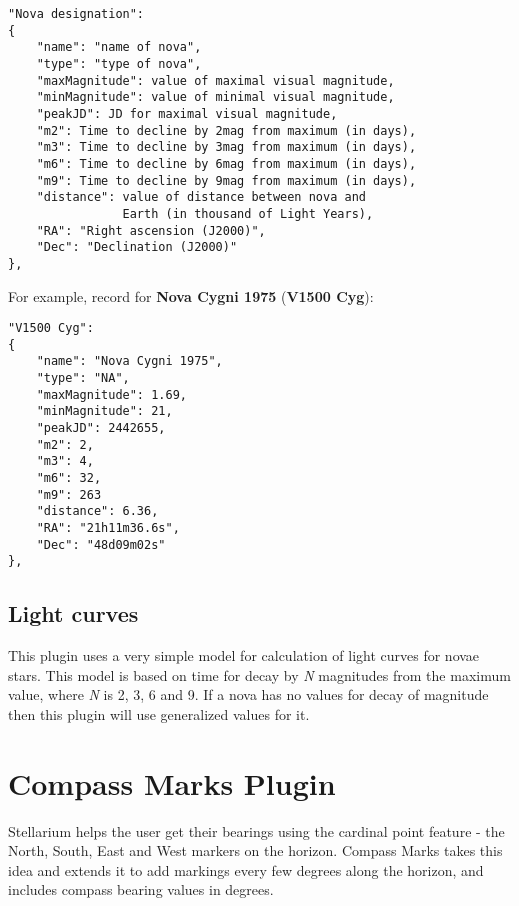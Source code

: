 \begin{config}
\begin{verbatim}
"Nova designation":
{
    "name": "name of nova",
    "type": "type of nova",
    "maxMagnitude": value of maximal visual magnitude,
    "minMagnitude": value of minimal visual magnitude,
    "peakJD": JD for maximal visual magnitude,
    "m2": Time to decline by 2mag from maximum (in days),
    "m3": Time to decline by 3mag from maximum (in days),
    "m6": Time to decline by 6mag from maximum (in days),
    "m9": Time to decline by 9mag from maximum (in days),
    "distance": value of distance between nova and 
                Earth (in thousand of Light Years),
    "RA": "Right ascension (J2000)",
    "Dec": "Declination (J2000)"
},
\end{verbatim}
\end{config}

\newpage
For example, record for \textbf{Nova Cygni 1975} (\textbf{V1500 Cyg}):

\begin{config}
\begin{verbatim}
"V1500 Cyg":
{
    "name": "Nova Cygni 1975",
    "type": "NA",
    "maxMagnitude": 1.69,
    "minMagnitude": 21,
    "peakJD": 2442655,
    "m2": 2,
    "m3": 4,
    "m6": 32,
    "m9": 263
    "distance": 6.36,
    "RA": "21h11m36.6s",
    "Dec": "48d09m02s"
},
\end{verbatim}
\end{config}

\subsection{Light curves}\label{light-curves}

This plugin uses a very simple model for calculation of light curves for
novae stars. This model is based on time for decay by \emph{N}
magnitudes from the maximum value, where \emph{N} is 2, 3, 6 and 9. If a
nova has no values for decay of magnitude then this plugin will use
generalized values for it.

\section{Compass Marks Plugin}\label{compass-marks-plugin}


Stellarium helps the user get their bearings using the cardinal point
feature - the North, South, East and West markers on the horizon.
Compass Marks takes this idea and extends it to add markings every few
degrees along the horizon, and includes compass bearing values in
degrees.


